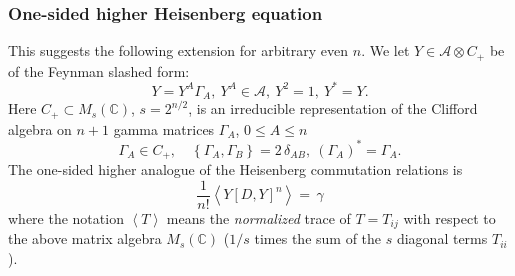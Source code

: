 \documentclass[12pt]{article}
\def\cA{{\mathcal A}}
\begin{document}
\subsubsection{One-sided  higher Heisenberg equation}
This suggests the following extension for arbitrary even $n$.
 We let $Y\in\mathcal{A}\otimes
C_{+}$ be of the Feynman slashed form:
\begin{equation}
Y=Y^{A}\Gamma_{A}, \ Y^{A}\in \cA, \ Y^{2}=1,  \  Y^{\ast}= Y. \label{zzz}%
\end{equation}
Here  $C_{+}\subset M_{s}(\mathbb{C})$, $s=2^{n/2}$, is an irreducible representation of 
the Clifford algebra on $n+1$ gamma matrices $\Gamma_{A}$, $0\leq A\leq
n$
\[
\Gamma_{A}\in C_{+}, \quad\left\{  \Gamma_{A},\Gamma_{B}\right\}
=2\,\delta_{AB},\ (\Gamma_{A})^{\ast}=\Gamma_{A}.%
\]
The one-sided higher analogue of the Heisenberg commutation relations is
\begin{equation}
\frac{1}{n!}\left\langle Y\left[  D,Y\right]^n
\right\rangle =\,\gamma  \label{yyy}%
\end{equation}
where the notation $\left\langle T\right\rangle $ means the \emph{normalized}
trace of $T=T_{ij}$ with respect to the above matrix algebra $M_{s}%
(\mathbb{C})$ ($1/s$ times the sum of the $s$ diagonal terms $T_{ii}$). 
\end{document}
